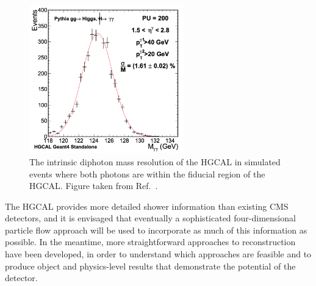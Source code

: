\begin{figure}[h!]
  \centering
  \includegraphics[width=0.6\textwidth]{Figures/HGCAL/HggReso.png}
  \caption[HGCAL diphoton mass resolution.]
  {
    The intrinsic diphoton mass resolution of the HGCAL in simulated \Hgg events 
    where both photons are within the fiducial region of the HGCAL. 
    Figure taken from Ref.~\cite{HGCAL}.
  }
  \label{fig:hgcal_DiphotonReso}
\end{figure}

The HGCAL provides more detailed shower information than existing CMS detectors, 
and it is envisaged that eventually a sophisticated four-dimensional particle flow approach will be used to incorporate as much of this information as possible. 
In the meantime, more straightforward approaches to reconstruction have been developed, 
in order to understand which approaches are feasible and to produce object and physics-level results that demonstrate the potential of the detector. 

